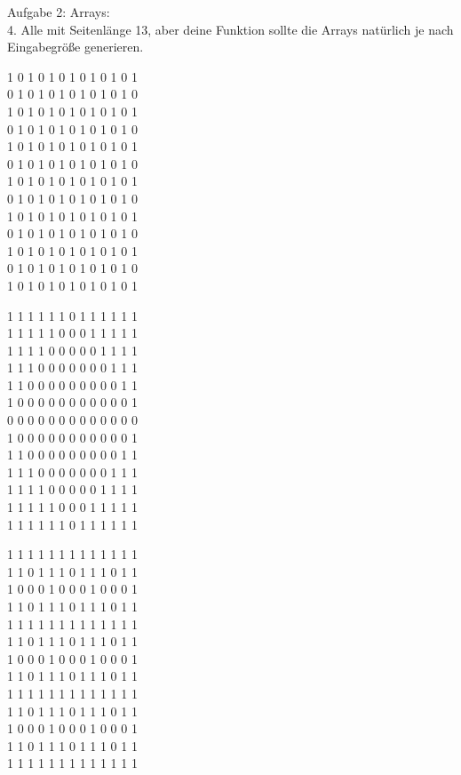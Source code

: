\documentclass{../../sheet}
\begin{document}
\newpage
{}
\hypertarget{Aufgabe_4}{}
Aufgabe 2: Arrays:\\
4. Alle mit Seitenlänge 13, aber deine Funktion sollte die Arrays natürlich je nach Eingabegröße generieren.
\begin{ausgabe}
    1 0 1 0 1 0 1 0 1 0 1 0 1 \\
    0 1 0 1 0 1 0 1 0 1 0 1 0 \\
    1 0 1 0 1 0 1 0 1 0 1 0 1 \\
    0 1 0 1 0 1 0 1 0 1 0 1 0 \\
    1 0 1 0 1 0 1 0 1 0 1 0 1 \\
    0 1 0 1 0 1 0 1 0 1 0 1 0 \\
    1 0 1 0 1 0 1 0 1 0 1 0 1 \\
    0 1 0 1 0 1 0 1 0 1 0 1 0 \\
    1 0 1 0 1 0 1 0 1 0 1 0 1 \\
    0 1 0 1 0 1 0 1 0 1 0 1 0 \\
    1 0 1 0 1 0 1 0 1 0 1 0 1 \\
    0 1 0 1 0 1 0 1 0 1 0 1 0 \\
    1 0 1 0 1 0 1 0 1 0 1 0 1
\end{ausgabe}
\begin{ausgabe}
    1 1 1 1 1 1 0 1 1 1 1 1 1 \\
    1 1 1 1 1 0 0 0 1 1 1 1 1 \\
    1 1 1 1 0 0 0 0 0 1 1 1 1 \\
    1 1 1 0 0 0 0 0 0 0 1 1 1 \\
    1 1 0 0 0 0 0 0 0 0 0 1 1 \\
    1 0 0 0 0 0 0 0 0 0 0 0 1 \\
    0 0 0 0 0 0 0 0 0 0 0 0 0 \\
    1 0 0 0 0 0 0 0 0 0 0 0 1 \\
    1 1 0 0 0 0 0 0 0 0 0 1 1 \\
    1 1 1 0 0 0 0 0 0 0 1 1 1 \\
    1 1 1 1 0 0 0 0 0 1 1 1 1 \\
    1 1 1 1 1 0 0 0 1 1 1 1 1 \\
    1 1 1 1 1 1 0 1 1 1 1 1 1
\end{ausgabe}
\begin{ausgabe}
    1 1 1 1 1 1 1 1 1 1 1 1 1 \\
    1 1 0 1 1 1 0 1 1 1 0 1 1 \\
    1 0 0 0 1 0 0 0 1 0 0 0 1 \\
    1 1 0 1 1 1 0 1 1 1 0 1 1 \\
    1 1 1 1 1 1 1 1 1 1 1 1 1 \\
    1 1 0 1 1 1 0 1 1 1 0 1 1 \\
    1 0 0 0 1 0 0 0 1 0 0 0 1 \\
    1 1 0 1 1 1 0 1 1 1 0 1 1 \\
    1 1 1 1 1 1 1 1 1 1 1 1 1 \\
    1 1 0 1 1 1 0 1 1 1 0 1 1 \\
    1 0 0 0 1 0 0 0 1 0 0 0 1 \\
    1 1 0 1 1 1 0 1 1 1 0 1 1 \\
    1 1 1 1 1 1 1 1 1 1 1 1 1
\end{ausgabe}
\end{document}
